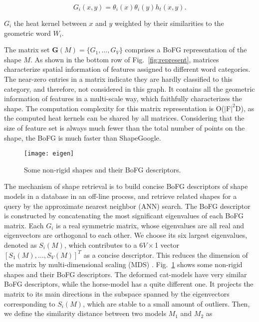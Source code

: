 \begin{equation}
G_i(x,y)=\theta_i(x)\theta_i(y)h_t(x,y).
\end{equation}

$G_i$ the heat kernel between $x$ and $y$ weighted by their similarities to the geometric word $W_i$.

The matrix set $\textbf{G}(M)=\{G_1,\dots,G_V\}$ comprises a BoFG representation of the shape $M$.
As shown in the bottom row of Fig.~\ref{fig:represent}, matrices characterize spatial information
of features assigned to different word categories. The near-zero entries in a matrix indicate
they are hardly classified to this category, and therefore, not considered in this graph.
It contains all the geometric information of features in a multi-scale way, which faithfully
characterizes the shape. The computation complexity for this matrix representation
is O($|$F$|^2$D), as the computed heat kernels can be shared by all matrices.
Considering that the size of feature set is always much fewer than the total number of points on the
shape, the BoFG is much faster than ShapeGoogle.

\begin{figure}
\centering
\texttt{[image: eigen]}
\caption[Nonrigid shapes and their BoFG descriptors.]
{Some non-rigid shapes and their BoFG descriptors.}
\label{fig:eigen}
\end{figure}

The mechanism of shape retrieval is to build concise BoFG descriptors of shape models in a database
in an off-line process, and retrieve related shapes for a query by the approximate nearest neighbor
(ANN) search. The BoFG descriptor is constructed by concatenating the most significant eigenvalues of each BoFG matrix.
Each $G_i$ is a real symmetric matrix, whose eigenvalues are all real and eigenvectors are orthogonal to each other.
We choose its six largest eigenvalues, denoted as $S_i(M)$, which contributes to a $6V \times$1 vector $[S_1(M),\dots,S_V(M)]^T$
as a concise descriptor. This reduces the dimension of the matrix by multi-dimensional scaling (MDS) \cite{Bronstein2006}.
Fig.~\ref{fig:eigen} shows some non-rigid shapes and their BoFG descriptors. The deformed cat-models
have very similar BoFG descriptors, while the horse-model has a quite different one. It projects the matrix to
its main directions in the subspace spanned by the eigenvectors corresponding to $S_i(M)$,
which are stable to a small amount of outliers. Then, we define the similarity distance between two models $M_1$ and $M_2$ as

